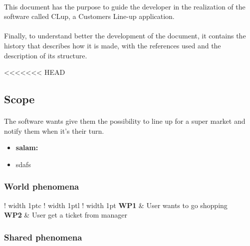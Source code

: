 \paragraph{}
This document has the purpose to guide the developer in the realization of the software called CLup, a Customers Line-up application.

\paragraph{}
Finally, to understand better the development of the document, it contains the history that describes how it is made, with the references used and the description of its structure.

<<<<<<< HEAD
\subsection{Scope}

\paragraph{}
The software wants give them the possibility to line up for a super market and notify them when it's their turn.

\begin{itemize}
\item \textbf{salam:}
\item sdafs
\end{itemize}


\subsubsection{World phenomena}
\newcommand{\Vline}{\color{lightBlueBorder} \vrule width 1pt}
\def\arraystretch{1.5}

\setlength\arrayrulewidth{1pt}
\setlength\LTleft{0pt}

\begin{longtable}{!\Vline c !\Vline l !\Vline} 
    \hline
    \textbf{WP1} & User wants to go shopping  \\
    \textbf{WP2} & User get a ticket from manager  \\  \hline
\end{longtable}

\subsubsection{Shared phenomena}
\renewcommand{\Vline}{\color{lightBlueBorder} \vrule width 1pt}
\def\arraystretch{1.5}

